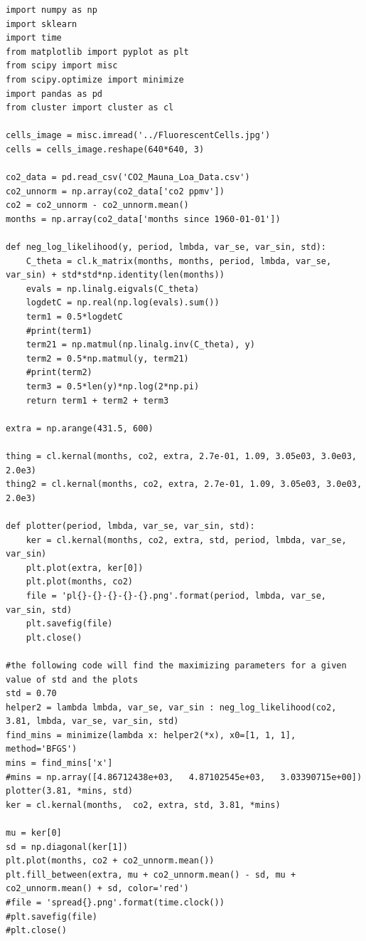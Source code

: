 \documentclass[a4paper]{article}
\begin{document}
\begin{verbatim}
import numpy as np
import sklearn
import time
from matplotlib import pyplot as plt
from scipy import misc
from scipy.optimize import minimize
import pandas as pd
from cluster import cluster as cl

cells_image = misc.imread('../FluorescentCells.jpg')
cells = cells_image.reshape(640*640, 3)

co2_data = pd.read_csv('CO2_Mauna_Loa_Data.csv')
co2_unnorm = np.array(co2_data['co2 ppmv'])
co2 = co2_unnorm - co2_unnorm.mean()
months = np.array(co2_data['months since 1960-01-01'])

def neg_log_likelihood(y, period, lmbda, var_se, var_sin, std):
    C_theta = cl.k_matrix(months, months, period, lmbda, var_se, var_sin) + std*std*np.identity(len(months))
    evals = np.linalg.eigvals(C_theta)
    logdetC = np.real(np.log(evals).sum())
    term1 = 0.5*logdetC
    #print(term1)
    term21 = np.matmul(np.linalg.inv(C_theta), y)
    term2 = 0.5*np.matmul(y, term21)
    #print(term2)
    term3 = 0.5*len(y)*np.log(2*np.pi)
    return term1 + term2 + term3

extra = np.arange(431.5, 600)

thing = cl.kernal(months, co2, extra, 2.7e-01, 1.09, 3.05e03, 3.0e03, 2.0e3)
thing2 = cl.kernal(months, co2, extra, 2.7e-01, 1.09, 3.05e03, 3.0e03, 2.0e3)

def plotter(period, lmbda, var_se, var_sin, std):
    ker = cl.kernal(months, co2, extra, std, period, lmbda, var_se, var_sin)
    plt.plot(extra, ker[0])
    plt.plot(months, co2)
    file = 'pl{}-{}-{}-{}-{}.png'.format(period, lmbda, var_se, var_sin, std)
    plt.savefig(file)
    plt.close()

#the following code will find the maximizing parameters for a given value of std and the plots
std = 0.70
helper2 = lambda lmbda, var_se, var_sin : neg_log_likelihood(co2, 3.81, lmbda, var_se, var_sin, std)
find_mins = minimize(lambda x: helper2(*x), x0=[1, 1, 1], method='BFGS')
mins = find_mins['x']
#mins = np.array([4.86712438e+03,   4.87102545e+03,   3.03390715e+00])
plotter(3.81, *mins, std)
ker = cl.kernal(months,  co2, extra, std, 3.81, *mins)

mu = ker[0]
sd = np.diagonal(ker[1])
plt.plot(months, co2 + co2_unnorm.mean())
plt.fill_between(extra, mu + co2_unnorm.mean() - sd, mu + co2_unnorm.mean() + sd, color='red')
#file = 'spread{}.png'.format(time.clock())
#plt.savefig(file)
#plt.close()
\end{verbatim}
\end{document}
